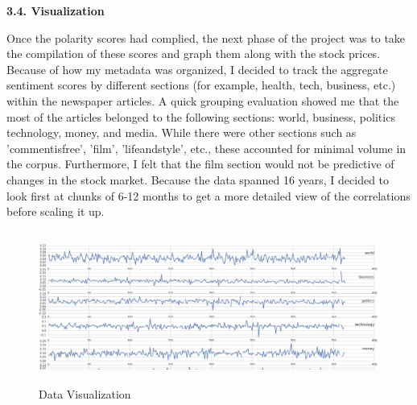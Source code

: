 \documentclass{acm_proc_article-sp}
\begin{document}
\textbf{3.4. Visualization  }

Once the polarity scores had complied, the next phase of the project was to take the compilation of these scores and graph them along with the stock prices. Because of how my metadata was organized, I decided to track the aggregate sentiment scores by different sections (for example, health, tech, business, etc.) within the newspaper articles. A quick grouping evaluation showed me that the most of the articles belonged to the following sections: world, business, politics technology, money, and media. While there were other sections such as 'commentisfree', 'film', 'lifeandstyle', etc., these accounted for minimal volume in the corpus. Furthermore, I felt that the film section would not be predictive of changes in the stock market. Because the data spanned 16 years, I decided to look first at chunks of 6-12 months to get a more detailed view of the correlations before scaling it up.

\begin{figure}[htp]
\centering
\includegraphics[width=\linewidth, height=5cm]{figures/visual2.png}
\caption{Data Visualization}
\label{fig:datavis}
\end{figure}
\end{document}
